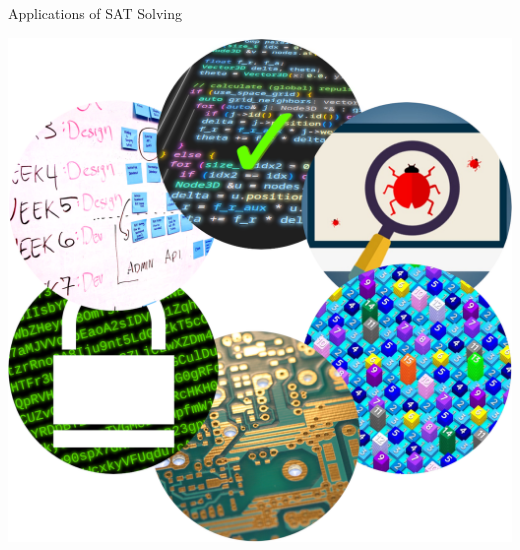 \documentclass[t]{sdqbeamer}
\begin{document}
\begin{frame}{Applications of SAT Solving}
\begin{minipage}{0.28\textwidth}
	\includegraphics[width=\textwidth]{figures/l01/applications.png}
\end{minipage}
\end{frame}
\end{document}
